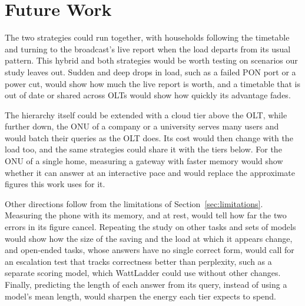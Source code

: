 \documentclass[cic,dipl,english]{infufrgs}
\begin{document}
\section{Future Work}
\label{sec:future-work}

The two strategies could run together, with households following the timetable
and turning to the broadcast's live report when the load departs from its usual pattern. This
hybrid and both strategies would be worth testing on scenarios our study leaves out. Sudden and
deep drops in load, such as a failed PON port or a power cut, would show how much the live report
is worth, and a timetable that is out of date or shared across OLTs would show how quickly its
advantage fades.

The hierarchy itself could be extended with a cloud tier above the OLT, while
further down, the ONU of a company or a university serves many users and would batch their
queries as the OLT does. Its cost would then change with the load too, and the same strategies
could share it with the tiers below. For the ONU of a single home, measuring a gateway
with faster memory would show whether it can answer at an interactive pace and would replace
the approximate figures this work uses for it.

Other directions follow from the limitations of Section~\ref{sec:limitations}. Measuring the
phone with its memory, and at rest, would tell how far the two errors in its figure cancel.
Repeating the study on other tasks and sets of models would show how the size of the saving and
the load at which it appears change, and open-ended tasks, whose answers have no single correct
form, would call for an escalation test that tracks correctness better than perplexity, such as
a separate scoring model, which WattLadder could use without other changes. Finally, predicting
the length of each answer from its query, instead of using a model's mean length, would sharpen
the energy each tier expects to spend.



\end{document}
